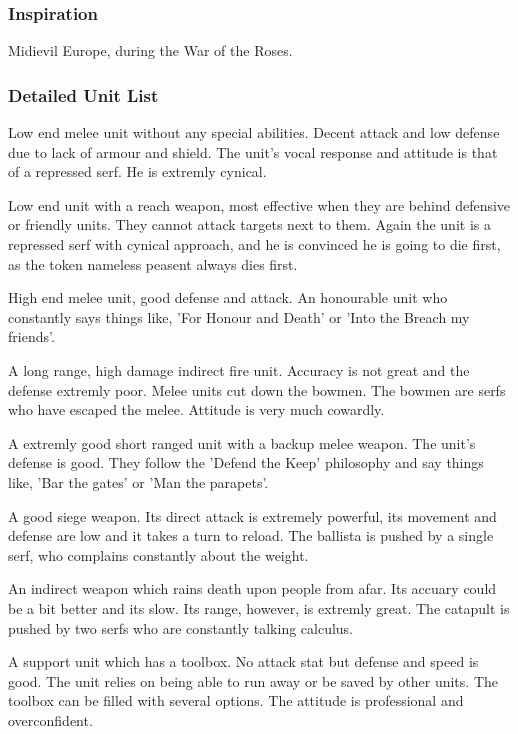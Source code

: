 \documentclass[a4paper,twocolumn]{article}
\begin{document}
\subsubsection{Inspiration}

Midievil Europe, during the War of the Roses.

\subsubsection{Detailed Unit List}

Low end melee unit without any special abilities. Decent attack and low defense due to lack of armour and shield.
The unit's vocal response and attitude is that of a repressed serf. He is extremly cynical.

Low end unit with a reach weapon, most effective when they are behind defensive or friendly units. They cannot attack targets next to them. Again the unit is a repressed serf with cynical approach, and he is convinced he is going to die first, as the token nameless peasent always dies first.

High end melee unit, good defense and attack. An honourable unit who constantly says things like, 'For Honour and Death' or 'Into the Breach my friends'.

A long range, high damage indirect fire unit. Accuracy is not great and the defense extremly poor. Melee units cut down the bowmen. The bowmen are serfs who have escaped the melee. Attitude is very much cowardly.

A extremly good short ranged unit with a backup melee weapon. The unit's defense is good. They follow the 'Defend the Keep' philosophy and say things like, 'Bar the gates' or 'Man the parapets'.

A good siege weapon. Its direct attack is extremely powerful, its movement and defense are low and it takes a turn to reload. The ballista is pushed by a single serf, who complains constantly about the weight.

An indirect weapon which rains death upon people from afar. Its accuary could be a bit better and its slow. Its range, however, is extremly great. The catapult is pushed by two serfs who are constantly talking calculus.

A support unit which has a toolbox. No attack stat but defense and speed is good. The unit relies on being able to run away or be saved by other units. The toolbox can be filled with several options. The attitude is professional and overconfident.
\end{document}
